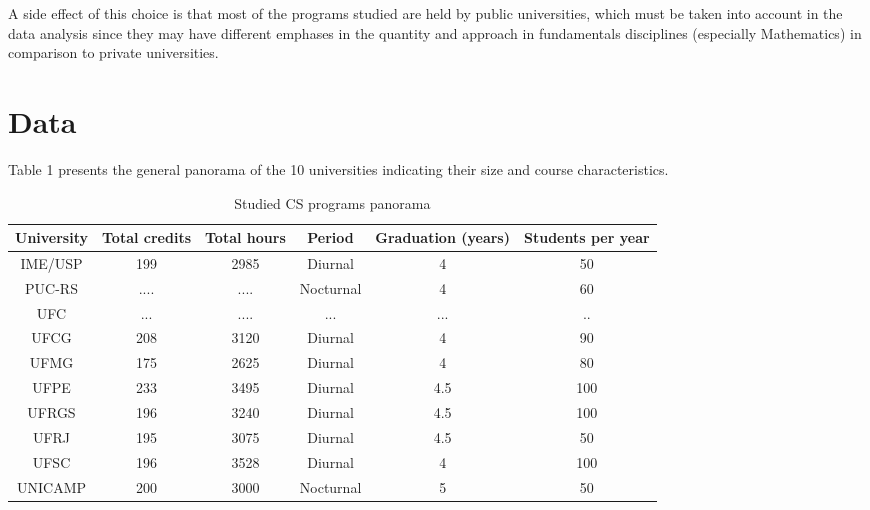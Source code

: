 \documentclass[conference]{IEEEtran}
\begin{document}
	A side effect of this choice is that most of the programs studied are held by public universities, which must be taken into account in the data analysis since they may have different emphases in the quantity and approach in fundamentals disciplines (especially Mathematics) in comparison to private universities.
	
\section{Data}
Table 1 presents the general panorama of the 10 universities indicating their size and course characteristics.

\begin{table*}
	\centering
	\caption{Studied CS programs panorama}
    \begin{tabular}{|c|c|c|c|c|c|}
        \hline
        University         & Total credits  & Total hours & Period           & Graduation (years) & Students per year \\ \hline
        IME/USP \cite{ime} & 199            & 2985        & Diurnal          & 4               & 50                   \\ 
        PUC-RS \cite{pucrs}& ....           & ....        & Nocturnal        & 4               & 60                   \\ 
        UFC \cite{ufc}     & ...            & ....        & ...              & ...             & ..                   \\ 
        UFCG \cite{ufcg}   & 208            & 3120        & Diurnal          & 4               & 90                   \\ 
        UFMG \cite{ufmg}   & 175            & 2625        & Diurnal          & 4               & 80                   \\ 
        UFPE \cite{ufpe}   & 233            & 3495        & Diurnal          & 4.5             & 100                  \\ 
        UFRGS \cite{ufrgs} & 196            & 3240        & Diurnal          & 4.5             & 100                  \\ 
        UFRJ \cite{ufrj}   & 195            & 3075        & Diurnal          & 4.5             & 50                   \\ 
        UFSC \cite{ufsc}   & 196            & 3528        & Diurnal          & 4               & 100                  \\ 
        UNICAMP \cite{unicamp}& 200         & 3000        & Nocturnal        & 5               & 50                   \\ 

\end{tabular}
\end{table*}
\end{document}
